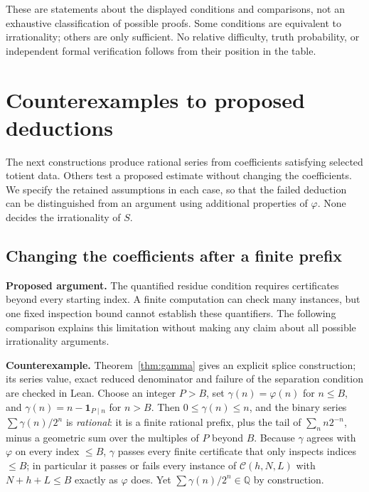 \documentclass[11pt]{article}
\theoremstyle{plain}
\theoremstyle{definition}
\theoremstyle{remark}
\newcommand{\lean}[2]{\leanlink{#2}}
\begin{document}
These are statements about the displayed conditions and comparisons, not
an exhaustive classification of possible proofs. Some conditions are
equivalent to irrationality; others are only sufficient. No relative
difficulty, truth probability, or independent formal verification follows
from their position in the table.

\section{Counterexamples to proposed deductions}

The next constructions produce rational series from coefficients
satisfying selected totient data. Others test a proposed estimate
without changing the coefficients. We specify the retained assumptions
in each case, so that the failed deduction can be distinguished from
an argument using additional properties of $\varphi$. None decides the
irrationality of $S$.


\subsection{Changing the coefficients after a finite prefix}

\textbf{Proposed argument.} The quantified residue condition requires
certificates beyond every starting index. A finite computation can check
many instances, but one fixed inspection bound cannot establish these
quantifiers. The following comparison explains this limitation without
making any claim about all possible irrationality arguments.
\lean{Erdos249257.TotientTailPeriodKiller.irrational_totient_series_iff_certificate_supply}{LcmConeFlatness.lean:412}


\textbf{Counterexample.} Theorem~\ref{thm:gamma} gives an explicit splice
construction; its series value, exact reduced denominator and failure of the
separation condition are checked in Lean. Choose an integer \(P>B\), set
\(\gamma(n)=\varphi(n)\) for \(n\le B\), and \(\gamma(n)=n-\mathbf 1_{P\mid n}\)
for \(n>B\). Then \(0\le\gamma(n)\le n\), and the binary series
\(\sum\gamma(n)/2^n\) is \emph{rational}: it is a finite rational prefix, plus
the tail of \(\sum_n n2^{-n}\), minus a geometric sum over the multiples of
\(P\) beyond \(B\). Because \(\gamma\) agrees with \(\varphi\) on every index
\(\le B\), \(\gamma\) passes every finite certificate that only inspects
indices \(\le B\); in particular it passes or fails every instance of
\(\mathcal{C}(h,N,L)\) with \(N+h+L\le B\) exactly as \(\varphi\) does. Yet
\(\sum\gamma(n)/2^n\in\mathbb Q\) by construction.
\end{document}
